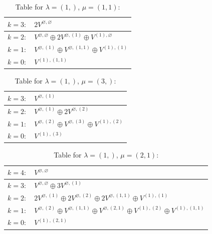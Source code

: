 \renewcommand{\arraystretch}{1.6} 
\begin{table}[H]
\centering
\caption{Table for $\lambda = (1,)$, $\mu = (1, 1)$:}
\begin{tabular}{|>{\centering\arraybackslash}p{15cm}|}
\hline
 $k = 3: \quad 2 V^{\varnothing, \varnothing} $ \\ \hline
 $k = 2: \quad V^{\varnothing, \varnothing} \oplus 2 V^{\varnothing, (1)} \oplus V^{(1), \varnothing} $ \\ \hline
 $k = 1: \quad V^{\varnothing, (1)} \oplus V^{\varnothing, (1, 1)} \oplus V^{(1), (1)} $ \\ \hline
 $k = 0: \quad V^{(1), (1, 1)} $ \\ \hline
\end{tabular}
\end{table}

\renewcommand{\arraystretch}{1.6} 
\begin{table}[H]
\centering
\caption{Table for $\lambda = (1,)$, $\mu = (3,)$:}
\begin{tabular}{|>{\centering\arraybackslash}p{15cm}|}
\hline
 $k = 3: \quad V^{\varnothing, (1)} $ \\ \hline
 $k = 2: \quad V^{\varnothing, (1)} \oplus 2 V^{\varnothing, (2)} $ \\ \hline
 $k = 1: \quad V^{\varnothing, (2)} \oplus V^{\varnothing, (3)} \oplus V^{(1), (2)} $ \\ \hline
 $k = 0: \quad V^{(1), (3)} $ \\ \hline
\end{tabular}
\end{table}

\renewcommand{\arraystretch}{1.6} 
\begin{table}[H]
\centering
\caption{Table for $\lambda = (1,)$, $\mu = (2, 1)$:}
\begin{tabular}{|>{\centering\arraybackslash}p{15cm}|}
\hline
 $k = 4: \quad V^{\varnothing, \varnothing} $ \\ \hline
 $k = 3: \quad V^{\varnothing, \varnothing} \oplus 3 V^{\varnothing, (1)} $ \\ \hline
 $k = 2: \quad 2 V^{\varnothing, (1)} \oplus 2 V^{\varnothing, (2)} \oplus 2 V^{\varnothing, (1, 1)} \oplus V^{(1), (1)} $ \\ \hline
 $k = 1: \quad V^{\varnothing, (2)} \oplus V^{\varnothing, (1, 1)} \oplus V^{\varnothing, (2, 1)} \oplus V^{(1), (2)} \oplus V^{(1), (1, 1)} $ \\ \hline
 $k = 0: \quad V^{(1), (2, 1)} $ \\ \hline
\end{tabular}
\end{table}

